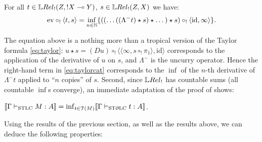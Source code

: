 \begin{theorem}\label{thm:modelsTaylor}
 For all $t\in\HOM{\LREL_!}{Z}{!X\multimap Y}$, $s\in\HOM{\LREL_!}{Z}{X}$ we have:%
 \begin{align}\label{eq:taylorcat}
  \mathrm{ev}\circ_!\langle t,s\rangle =
  \inf\limits_{n\in\mathbb{N}}
  \{((\dots((\Lambda^- t)\star s)\star \dots)\star s)\circ_! \langle \mathrm{id},\infty \rangle\}.
 \end{align} 
\end{theorem}
The equation above is a nothing more than a tropical version of the Taylor formula \eqref{eq:taylor}:
$u\star s= (Du)\circ_{!} \langle \langle  \infty, s\circ_{!} \pi_{1}\rangle,\mathrm{id}\rangle$ corresponds to the application of the derivative of $u$ on $s$, and $\Lambda^-$ is the uncurry operator.
Hence the right-hand term in \eqref{eq:taylorcat} corresponds to the $\inf$ of the $n$-th derivative of $\Lambda^{-}t$ applied to ``$n$ copies'' of $s$.
Second, since $\LREL_!$ has countable sums (all countable $\inf$s converge), an immediate adaptation of the proof of \cite[Theorem 4.23]{Manzo2012} shows:

\begin{corollary}\label{cor:T(M)=M}
$\llbracket\Gamma\vdash_{\mathrm{STLC}} M:A\rrbracket=\inf_{t\in\mathcal{T}(M)} \llbracket\Gamma\vdash_{\mathrm{ST}\partial\mathrm{LC}} t:A\rrbracket$. %
\end{corollary}




Using the results of the previous section, as well as the results above, we can deduce the following properties:

